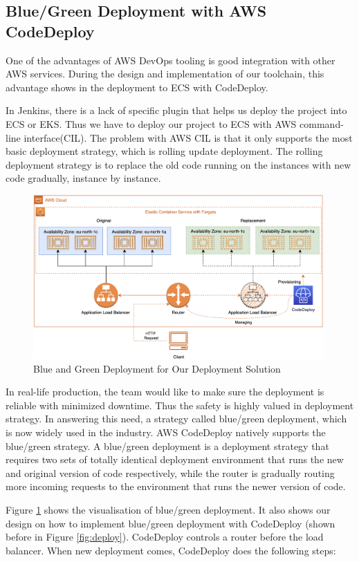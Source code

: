 \subsection{Blue/Green Deployment with AWS CodeDeploy}
One of the advantages of AWS DevOps tooling is good integration with other AWS services. During the design and implementation of our toolchain, this advantage shows in the deployment to ECS with CodeDeploy.
\par
In Jenkins, there is a lack of specific plugin that helps us deploy the project into ECS or EKS. Thus we have to deploy our project to ECS with AWS command-line interface(CIL). The problem with AWS CIL is that it only supports the most basic deployment strategy, which is rolling update deployment. The rolling deployment strategy is to replace the old code running on the instances with new code gradually, instance by instance. 
\begin{figure}[h]
 \centering
 \includegraphics[width=0.99\textwidth]{pics/bg.png}
 \caption{Blue and Green Deployment for Our Deployment Solution}
 \label{fig:bg}
\end{figure}
\par
In real-life production, the team would like to make sure the deployment is reliable with minimized downtime. Thus the safety is highly valued in deployment strategy. In answering this need, a strategy called blue/green deployment, which is now widely used in the industry. AWS CodeDeploy natively supports the blue/green strategy.
A blue/green deployment is a deployment strategy that requires two sets of totally identical deployment environment that runs the new and original version of code respectively, while the router is gradually routing more incoming requests to the environment that runs the newer version of code. 
\par
Figure \ref{fig:bg} shows the visualisation of blue/green deployment. It also shows our design on how to implement blue/green deployment with CodeDeploy (shown before in Figure \ref{fig:deploy}). CodeDeploy controls a router before the load balancer. When new deployment comes, CodeDeploy does the following steps:
